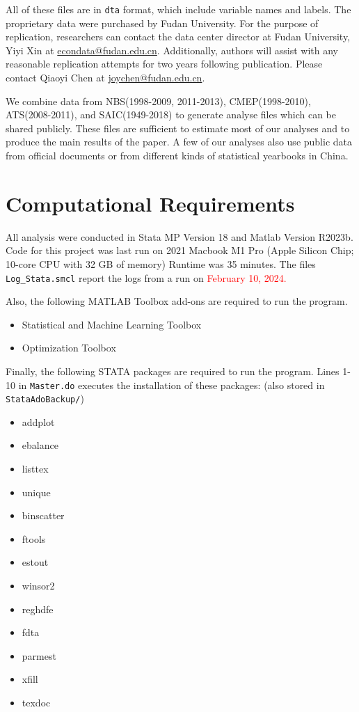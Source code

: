 \documentclass[12pt,notitlepage]{article}
\begin{document}
\noindent All of these files are in \texttt{dta} format, which include variable names and labels. The proprietary data were purchased by Fudan University. For the purpose of replication, researchers can contact the data center director at Fudan University, Yiyi Xin at \url{econdata@fudan.edu.cn}.  Additionally, authors will assist with any reasonable replication attempts for two years following publication. Please contact Qiaoyi Chen at \url{joychen@fudan.edu.cn}. 

\smallskip
{}

\smallskip 
\noindent We combine data from NBS(1998-2009, 2011-2013), CMEP(1998-2010), ATS(2008-2011), and SAIC(1949-2018) to generate analyse files which can be shared publicly. These files are sufficient to estimate most of our analyses and to produce the main results of the paper. A few of our analyses also use public data from official documents or from different kinds of statistical yearbooks in China. 

\section{Computational Requirements}

All analysis were conducted in Stata MP Version 18 and Matlab Version R2023b. Code for this project was last run on 2021 Macbook M1 Pro (Apple Silicon Chip; 10-core CPU with 32 GB of memory) Runtime was 35 minutes. The files \texttt{Log\_Stata.smcl} report the logs from a run on \textcolor{red}{February 10, 2024.} 

\bigskip

Also, the following MATLAB Toolbox add-ons are required to run the program.
\begin{itemize}
    \item Statistical and Machine Learning Toolbox
    \item Optimization Toolbox
\end{itemize}

Finally, the following STATA packages are required to run the program. Lines 1-10 in \texttt{Master.do} executes the installation of these packages: (also stored in \texttt{StataAdoBackup/})
\begin{itemize}
    \item addplot
    \item ebalance
    \item listtex
    \item unique
    \item binscatter
    \item ftools
    \item estout
    \item winsor2
    \item reghdfe
    \item fdta
    \item parmest
    \item xfill
    \item texdoc
\end{itemize}
\end{document}
